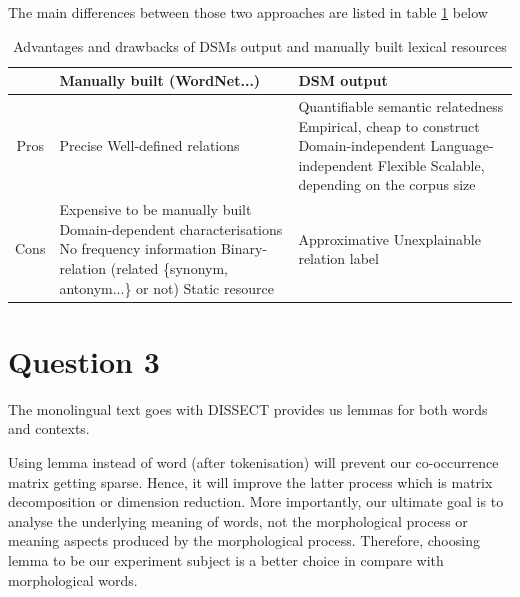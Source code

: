\documentclass[12pt]{article}
\begin{document}
The main differences between those two approaches are listed in table \ref{table:1} below
\begin{table}[H]
	\begin{tabular}{ | c | p{5.7cm} | p{5.7cm} | }
		\hline
		& Manually built (WordNet...) & DSM output \\
		\hline
		Pros &
			Precise \newline
			Well-defined relations \newline
		& 
			Quantifiable semantic relatedness \newline
			Empirical, cheap to construct \newline
			Domain-independent \newline
			Language-independent \newline
			Flexible \newline
			Scalable, depending on the corpus size \newline
		\\ 
		\hline
		Cons & 
			Expensive to be manually built \newline
			Domain-dependent characterisations \newline
			No frequency information \newline
			Binary-relation (related \{synonym, antonym...\} or not) \newline
			Static resource \newline
		& 
			Approximative \newline
			Unexplainable relation label \newline
		\\
		\hline
	\end{tabular}
	\caption{Advantages and drawbacks of DSMs output and manually built lexical resources}
	\label{table:1}
\end{table}

\section{Question 3}

The monolingual text goes with DISSECT provides us lemmas for both words and contexts.

Using lemma instead of word (after tokenisation) will prevent our co-occurrence matrix getting sparse. Hence, it will improve the latter process which is matrix decomposition or dimension reduction. More importantly, our ultimate goal is to analyse the underlying meaning of words, not the morphological process or meaning aspects produced by the morphological process. Therefore, choosing lemma to be our experiment subject is a better choice in compare with morphological words.
\end{document}
